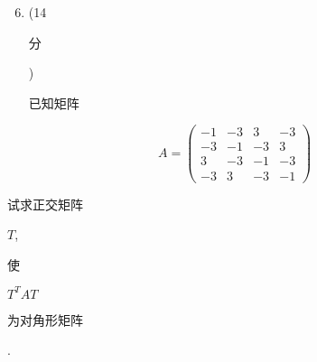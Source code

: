 \documentclass[10pt]{article}
\begin{document}
\begin{enumerate}
  \setcounter{enumi}{5}
  \item (14 \begin{CJK}{UTF8}{mj}分\end{CJK}) \begin{CJK}{UTF8}{mj}已知矩阵\end{CJK}
\end{enumerate}
$$
A=\left(\begin{array}{cccc}
-1 & -3 & 3 & -3 \\
-3 & -1 & -3 & 3 \\
3 & -3 & -1 & -3 \\
-3 & 3 & -3 & -1
\end{array}\right)
$$
\begin{CJK}{UTF8}{mj}试求正交矩阵\end{CJK} $T$, \begin{CJK}{UTF8}{mj}使\end{CJK} $T^{T} A T$ \begin{CJK}{UTF8}{mj}为对角形矩阵\end{CJK}.
\end{document}
